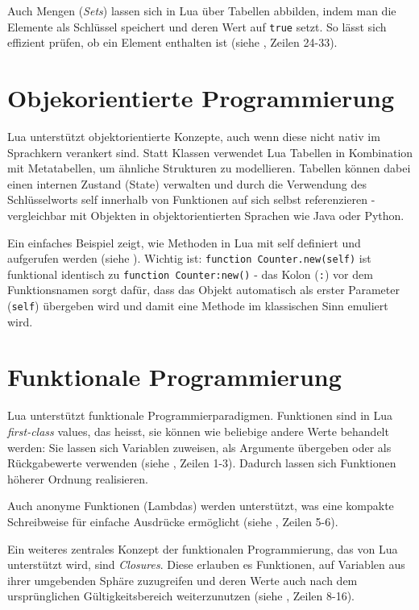 \documentclass[11pt,a4paper]{article}
\begin{document}
Auch Mengen (\textit{Sets}) lassen sich in Lua über Tabellen abbilden, indem man die Elemente als Schlüssel speichert und deren Wert auf \lstinline|true| setzt. 
So lässt sich effizient prüfen, ob ein Element enthalten ist (siehe , Zeilen 24-33).

\section*{Objekorientierte Programmierung}

Lua unterstützt objektorientierte Konzepte, auch wenn diese nicht nativ im Sprachkern verankert sind. 
Statt Klassen verwendet Lua Tabellen in Kombination mit Metatabellen, um ähnliche Strukturen zu modellieren.
Tabellen können dabei einen internen Zustand (State) verwalten und durch die Verwendung des Schlüsselworts self 
innerhalb von Funktionen auf sich selbst referenzieren - vergleichbar mit Objekten in objektorientierten Sprachen wie Java oder Python.

Ein einfaches Beispiel zeigt, wie Methoden in Lua mit self definiert und aufgerufen werden (siehe ).
Wichtig ist: \lstinline|function Counter.new(self)| ist funktional identisch zu \lstinline|function Counter:new()| -
das Kolon (\texttt{:}) vor dem Funktionsnamen sorgt dafür, dass das Objekt automatisch als erster Parameter (\texttt{self}) 
übergeben wird und damit eine Methode im klassischen Sinn emuliert wird.

\section*{Funktionale Programmierung}

Lua unterstützt funktionale Programmierparadigmen. Funktionen sind in Lua \textit{first-class} values, das heisst, 
sie können wie beliebige andere Werte behandelt werden: Sie lassen sich Variablen zuweisen, als Argumente übergeben 
oder als Rückgabewerte verwenden (siehe , Zeilen 1-3). Dadurch lassen sich Funktionen höherer Ordnung realisieren.

Auch anonyme Funktionen (Lambdas) werden unterstützt, was eine kompakte Schreibweise für einfache Ausdrücke ermöglicht (siehe , Zeilen 5-6).

Ein weiteres zentrales Konzept der funktionalen Programmierung, das von Lua unterstützt wird, sind \textit{Closures}. 
Diese erlauben es Funktionen, auf Variablen aus ihrer umgebenden Sphäre zuzugreifen und deren Werte auch nach dem ursprünglichen Gültigkeitsbereich weiterzunutzen (siehe , Zeilen 8-16).
\end{document}
